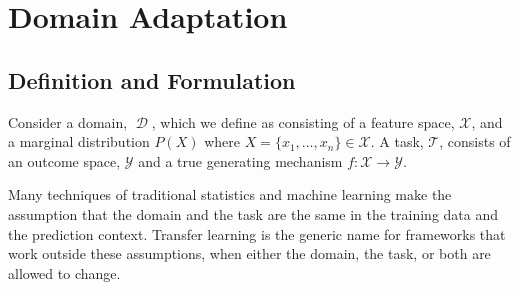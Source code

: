 \documentclass[a4paper,12pt]{article}
\DeclareMathOperator*{\D}{\mathcal{D}}
\begin{document}






\section{Domain Adaptation}

\subsection{Definition and Formulation}

Consider a domain, $\D$, which we define as consisting of a feature space, $\mathcal{X}$, and a marginal distribution $P(X)$ where $X = \{x_1,\ldots,x_n\} \in \mathcal{X}$. A task, $\mathcal{T}$, consists of an outcome space, $\mathcal{Y}$ and a true generating mechanism $f: \mathcal{X} \rightarrow \mathcal{Y}$.

Many techniques of traditional statistics and machine learning make the assumption that the domain and the task are the same in the training data and the prediction context. Transfer learning is the generic name for frameworks that work outside these assumptions, when either the domain, the task, or both are allowed to change.
\end{document}
